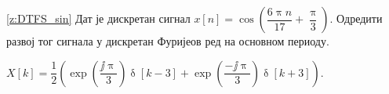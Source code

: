 \PID \ref{z:DTFS_sin}
Дат је дискретан сигнал 
$x[n] = \cos \left(
    \dfrac{6\uppi n}{17}  + \dfrac{\uppi}{3}
\right)$. Одредити развој тог сигнала у дискретан Фуријеов ред на основном периоду. 
\vspace*{2mm}

\textsc{}
$X[k] = \dfrac{1}{2}
\left(
    \exp\left( 
        \dfrac{\jj\uppi}{3}
     \right)
     \updelta[k-3] 
     +
     \exp\left( 
        \dfrac{-\jj\uppi}{3}
     \right)
     \updelta[k+3]
\right)$.